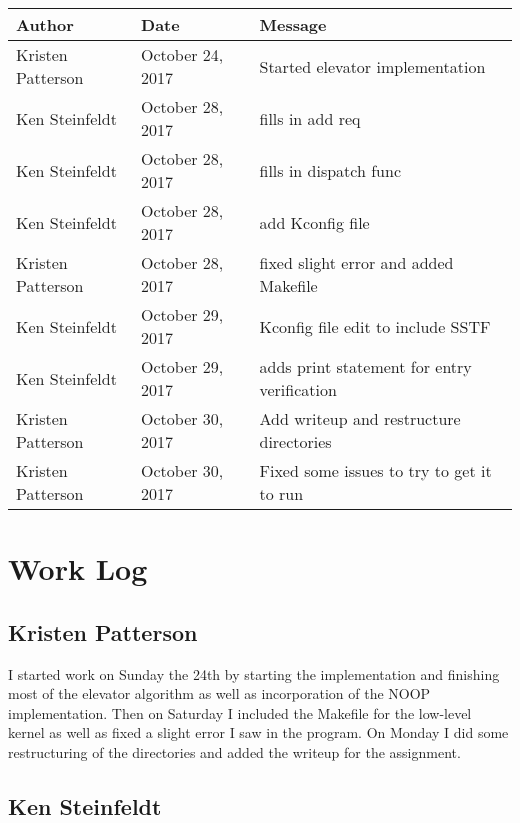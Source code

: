 \documentclass[10pt,letterpaper,onecolumn,draftclsnofoot]{IEEEtran}
\begin{document}
\begin{center}
	\begin{tabular}{|l|l|l|}
		\hline
		\textbf{Author} & \textbf{Date} & \textbf{Message} \\ \hline
		Kristen Patterson & October 24, 2017 & Started elevator implementation \\ \hline
		Ken Steinfeldt & October 28, 2017 & fills in add req \\ \hline
		Ken Steinfeldt & October 28, 2017 & fills in dispatch func \\ \hline
		Ken Steinfeldt & October 28, 2017 & add Kconfig file \\ \hline
		Kristen Patterson & October 28, 2017 & fixed slight error and added Makefile \\ \hline
		Ken Steinfeldt & October 29, 2017 & Kconfig file edit to include SSTF \\ \hline
		Ken Steinfeldt & October 29, 2017 & adds print statement for entry verification \\ \hline
		Kristen Patterson & October 30, 2017 & Add writeup and restructure directories \\ \hline
		Kristen Patterson & October 30, 2017 & Fixed some issues to try to get it to run \\ \hline
	\end{tabular}
\end{center}

\section{Work Log}
\subsection{Kristen Patterson}
I started work on Sunday the 24th by starting the implementation and finishing most of the elevator algorithm as well as incorporation of the NOOP implementation. Then on Saturday I included the Makefile for the low-level kernel as well as fixed a slight error I saw in the program. On Monday I did some restructuring of the directories and added the writeup for the assignment.

\subsection{Ken Steinfeldt}
\end{document}
